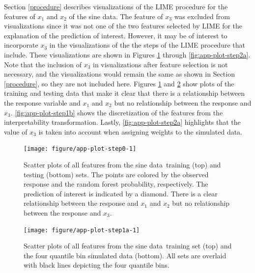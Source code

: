 \documentclass[AMS,STIX2COL]{WileyNJD-v2}\usepackage[]{graphicx}\usepackage[]{color}
\newenvironment{knitrout}{}{} %
\newcommand{\data}{sine data}
\begin{document}
{Section \ref{procedure} describes visualizations of the LIME procedure for the features of $x_1$ and $x_2$ of the \data. The feature of $x_3$ was excluded from visualizations since it was not one of the two features selected by LIME for the explanation of the prediction of interest. However, it may be of interest to incorporate $x_3$ in the visualizations of the the steps of the LIME procedure that include. These visualizations are shown in Figures \ref{fig:app-plot-step0} through \ref{fig:app-plot-step2a}. Note that the inclusion of $x_3$ in visualizations after feature selection is not necessary, and the visualizations would remain the same as shown in Section \ref{procedure}, so they are not included here. Figures \ref{fig:app-plot-step0} and \ref{fig:app-plot-step1a} show plots of the training and testing data that make it clear that there is a relationship between the response variable and $x_1$ and $x_2$ but no relationship between the response and $x_3$. \autoref{fig:app-plot-step1b} shows the discretization of the features from the interpretability transformation. Lastly, \autoref{fig:app-plot-step2a} highlights that the value of $x_3$ is taken into account when assigning weights to the simulated data.

\begin{figure}[!t]
\begin{knitrout}
\color{fgcolor}
\texttt{[image: figure/app-plot-step0-1]} 

\end{knitrout}
\caption{Scatter plots of all features from the \data \ training (top) and testing (bottom) sets. The points are colored by the observed response and the random forest probability, respectively. The prediction of interest is indicated by a diamond. There is a clear relationship between the response and $x_1$ and $x_2$ but no relationship between the response and $x_3$.}
\label{fig:app-plot-step0}
\end{figure}

\begin{figure}[!t]
\centering
\begin{knitrout}
\color{fgcolor}
\texttt{[image: figure/app-plot-step1a-1]} 

\end{knitrout}
\caption{Scatter plots of all features from the \data \ training set (top) and the four quantile bin simulated data (bottom). All sets are overlaid with black lines depicting the four quantile bins.}
\label{fig:app-plot-step1a}
\end{figure}

}
\end{document}
